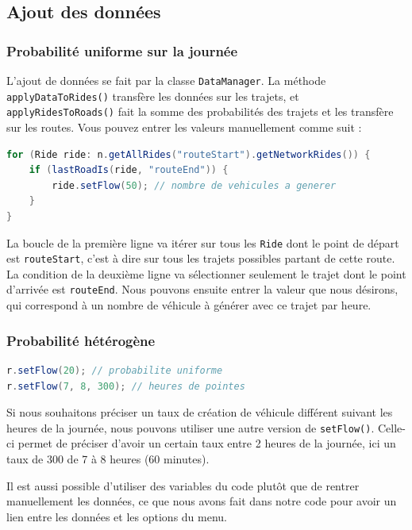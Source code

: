 \documentclass[a4paper,11pt, titlepage]{extarticle}
\begin{document}
\subsection{Ajout des données}

\subsubsection{Probabilité uniforme sur la journée}

L'ajout de données se fait par la classe \texttt{DataManager}. La méthode \texttt{applyDataToRides()} transfère les données sur les trajets, et \texttt{applyRidesToRoads()} fait la somme des probabilités des trajets et les transfère sur les routes. Vous pouvez entrer les valeurs manuellement comme suit : 

\begin{lstlisting}[language=Java]
for (Ride ride: n.getAllRides("routeStart").getNetworkRides()) {
	if (lastRoadIs(ride, "routeEnd")) {
		ride.setFlow(50); // nombre de vehicules a generer
	}
}
\end{lstlisting}

La boucle de la première ligne va itérer sur tous les \texttt{Ride} dont le point de départ est \texttt{routeStart}, c'est à dire sur tous les trajets possibles partant de cette route. La condition de la deuxième ligne va sélectionner seulement le trajet dont le point d'arrivée est \texttt{routeEnd}. Nous pouvons ensuite entrer la valeur que nous désirons, qui correspond à un nombre de véhicule à générer avec ce trajet par heure.

\subsubsection{Probabilité hétérogène}

\begin{lstlisting}[language=Java]
r.setFlow(20); // probabilite uniforme
r.setFlow(7, 8, 300); // heures de pointes
\end{lstlisting}

Si nous souhaitons préciser un taux de création de véhicule différent suivant les heures de la journée, nous pouvons utiliser une autre version de \texttt{setFlow()}. Celle-ci permet de préciser d'avoir un certain taux entre 2 heures de la journée, ici un taux de 300 de 7 à 8 heures (60 minutes).

Il est aussi possible d'utiliser des variables du code plutôt que de rentrer manuellement les données, ce que nous avons fait dans notre code pour avoir un lien entre les données et les options du menu.
\vspace{0.5cm}
\end{document}
